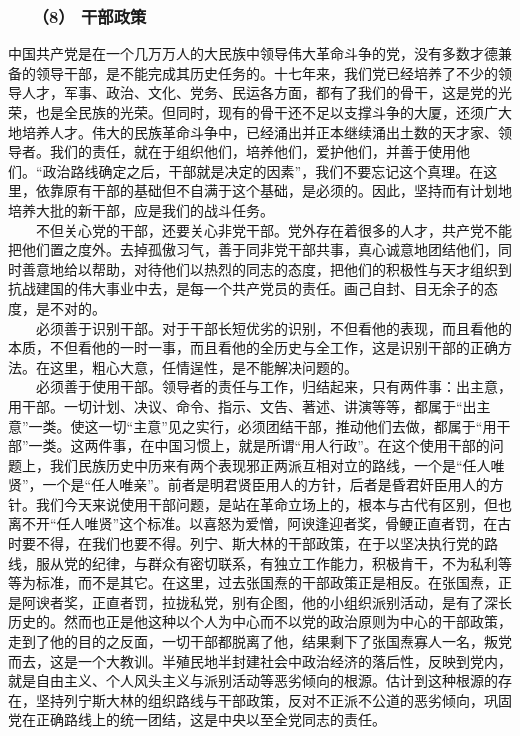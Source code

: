 \documentclass[cn,11pt,chinese]{elegantbook}
\def\myformat#1{\hfil\hfil #1}
\begin{document}
\subsubsection*{\myformat{　　（8） 干部政策}}
中国共产党是在一个几万万人的大民族中领导伟大革命斗争的党，没有多数才德兼备的领导干部，是不能完成其历史任务的。十七年来，我们党已经培养了不少的领导人才，军事、政治、文化、党务、民运各方面，都有了我们的骨干，这是党的光荣，也是全民族的光荣。但同时，现有的骨干还不足以支撑斗争的大厦，还须广大地培养人才。伟大的民族革命斗争中，已经涌出并正本继续涌出土数的天才家、领导者。我们的责任，就在于组织他们，培养他们，爱护他们，并善于使用他们。“政治路线确定之后，干部就是决定的因素”，我们不要忘记这个真理。在这里，依靠原有干部的基础但不自满于这个基础，是必须的。因此，坚持而有计划地培养大批的新干部，应是我们的战斗任务。\\
　　不但关心党的干部，还要关心非党干部。党外存在着很多的人才，共产党不能把他们置之度外。去掉孤傲习气，善于同非党干部共事，真心诚意地团结他们，同时善意地给以帮助，对待他们以热烈的同志的态度，把他们的积极性与天才组织到抗战建国的伟大事业中去，是每一个共产党员的责任。画己自封、目无余子的态度，是不对的。\\
　　必须善于识别干部。对于干部长短优劣的识别，不但看他的表现，而且看他的本质，不但看他的一时一事，而且看他的全历史与全工作，这是识别干部的正确方法。在这里，粗心大意，任情逞性，是不能解决问题的。\\
　　必须善于使用干部。领导者的责任与工作，归结起来，只有两件事：出主意，用干部。一切计划、决议、命令、指示、文告、著述、讲演等等，都属于“出主意”一类。使这一切“主意”见之实行，必须团结干部，推动他们去做，都属于“用干部”一类。这两件事，在中国习惯上，就是所谓“用人行政”。在这个使用干部的问题上，我们民族历史中历来有两个表现邪正两派互相对立的路线，一个是“任人唯贤”，一个是“任人唯亲”。前者是明君贤臣用人的方针，后者是昏君奸臣用人的方针。我们今天来说使用干部问题，是站在革命立场上的，根本与古代有区别，但也离不开“任人唯贤”这个标准。以喜怒为爱憎，阿谀逢迎者奖，骨鲠正直者罚，在古时要不得，在我们也要不得。列宁、斯大林的干部政策，在于以坚决执行党的路线，服从党的纪律，与群众有密切联系，有独立工作能力，积极肯干，不为私利等等为标准，而不是其它。在这里，过去张国焘的干部政策正是相反。在张国焘，正是阿谀者奖，正直者罚，拉拢私党，别有企图，他的小组织派别活动，是有了深长历史的。然而也正是他这种以个人为中心而不以党的政治原则为中心的干部政策，走到了他的目的之反面，一切干部都脱离了他，结果剩下了张国焘寡人一名，叛党而去，这是一个大教训。半殖民地半封建社会中政治经济的落后性，反映到党内，就是自由主义、个人风头主义与派别活动等恶劣倾向的根源。估计到这种根源的存在，坚持列宁斯大林的组织路线与干部政策，反对不正派不公道的恶劣倾向，巩固党在正确路线上的统一团结，这是中央以至全党同志的责任。\\
\end{document}
